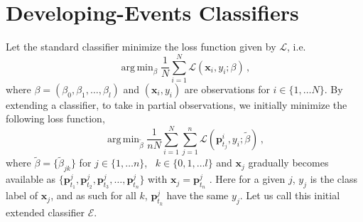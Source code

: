 \documentclass[a4paper,11pt]{article}
\DeclareMathOperator*{\argmin}{arg\,min}
\begin{document}


\section{Developing-Events Classifiers} \label{sec:ExtendedClassifier}

Let the standard classifier minimize the loss function given by $\mathscr{L}$, i.e.
$$
  \argmin_\beta \frac{1}{N}\sum_{i=1}^N \mathscr{L}(\bm{x}_i,y_i;\beta) \, ,
$$
where $\beta = \left( \beta_0, \beta_1, \dots, \beta_l \right)$ and $(\bm{x}_i, y_i)$ are observations for $i \in \{ 1, \dots N \}$. By extending a classifier, to take in partial observations, we initially minimize the following loss function,
$$
  \argmin_{\tilde{\beta}} \frac{1}{nN} \sum_{i=1}^N \sum_{j=1}^n \mathscr{L} \left( \bm{p}^i_{t_j},y_i;\tilde{\beta} \right) \, ,
$$
where $ \tilde{\beta} = \{ \tilde{\beta}_{jk} \}$ for $ j \in \{1, \dots n\}$, \, $ k \in \{0, 1, \dots l \} $ and $\bm{x}_j$ gradually becomes available as $\{\bm{p}^j_{t_1},\bm{p}^j_{t_2}, \bm{p}^j_{t_3}, \dots, \bm{p}^j_{t_n} \}$ with $\bm{x}_j = \bm{p}_{t_n}^j$ . Here for a given $j$, $y_j$ is the class label of $\bm{x}_j$, and as such for all $k$, $\bm{p}^j_{t_k}$ have the same $y_j$. Let us call this initial extended classifier $\mathscr{E}$.
\end{document}

